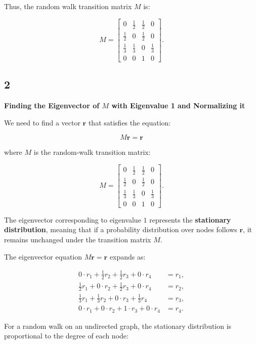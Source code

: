 \documentclass[a4paper,12pt]{article}
\begin{document}
Thus, the random walk transition matrix \(M\) is:

\[
M =
\begin{bmatrix}
0   & \frac{1}{2} & \frac{1}{2} & 0 \\
\frac{1}{2} & 0   & \frac{1}{2} & 0 \\
\frac{1}{3} & \frac{1}{3} & 0   & \frac{1}{3} \\
0   & 0   & 1   & 0
\end{bmatrix}.
\]

\subsection*{2}

\textbf{Finding the Eigenvector of \( M \) with Eigenvalue 1 and Normalizing it}


We need to find a vector \( \mathbf{r} \) that satisfies the equation:

\[
M \mathbf{r} = \mathbf{r}
\]

where \( M \) is the random-walk transition matrix:

\[
M =
\begin{bmatrix}
0 & \frac{1}{2} & \frac{1}{2} & 0 \\[6pt]
\frac{1}{2} & 0 & \frac{1}{2} & 0 \\[6pt]
\frac{1}{3} & \frac{1}{3} & 0 & \frac{1}{3} \\[6pt]
0 & 0 & 1 & 0
\end{bmatrix}.
\]

The eigenvector corresponding to eigenvalue \( 1 \) represents the \textbf{stationary distribution}, meaning that if a probability distribution over nodes follows \( \mathbf{r} \), it remains unchanged under the transition matrix \( M \).


The eigenvector equation \( M \mathbf{r} = \mathbf{r} \) expands as:

\begin{align}
    0 \cdot r_1 + \frac{1}{2} r_2 + \frac{1}{2} r_3 + 0 \cdot r_4 &= r_1, \\
    \frac{1}{2} r_1 + 0 \cdot r_2 + \frac{1}{2} r_3 + 0 \cdot r_4 &= r_2, \\
    \frac{1}{3} r_1 + \frac{1}{3} r_2 + 0 \cdot r_3 + \frac{1}{3} r_4 &= r_3, \\
    0 \cdot r_1 + 0 \cdot r_2 + 1 \cdot r_3 + 0 \cdot r_4 &= r_4.
\end{align}


For a random walk on an undirected graph, the stationary distribution is proportional to the degree of each node:
\end{document}
